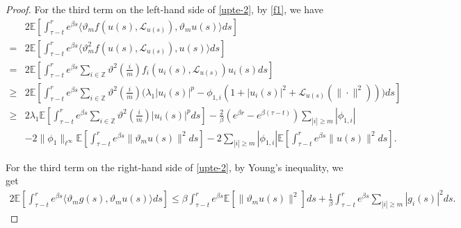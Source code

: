 \documentclass[11pt]{article}
\numberwithin{equation}{section}
\theoremstyle{plain}
\begin{document}
\begin{proof}
 For the third term on the left-hand side of \eqref{upte-2},
 by \eqref{f1}, we have
 \begin{align}\label{upte-4}
        & 2\mathbb{E}
               \left[ \int_{\tau-t}^{r} e^{\beta s}
                           \langle \vartheta_m f(u(s), \mathcal{L}_{u(s)}), \vartheta_m u(s) \rangle ds
               \right]  \nonumber\\
      = & 2\mathbb{E}
               \left[ \int_{\tau-t}^{r} e^{\beta s}
                            \langle{\vartheta}^2_m f(u(s), \mathcal{L}_{u(s)}),  u(s) \rangle ds
               \right]  \nonumber\\
      = & 2\mathbb{E}
               \left[ \int_{\tau-t}^{r} e^{\beta s}
                         \sum_{i \in \mathbb{Z}}
                              {\vartheta}^2(\frac{i}{m}) f_i(u_i(s), \mathcal{L}_{u(s)}) u_i(s) ds
               \right]  \nonumber\\
   \ge & 2\mathbb{E}
               \left[ \int_{\tau-t}^{r} e^{\beta s}
                            \sum_{i \in \mathbb{Z}}
                                 {\vartheta}^2(\frac{i}{m})
                                  \Big( \lambda_1 |u_i(s)|^p - \phi_{1,i} \left( 1 + |u_i(s)|^2 + \mathcal{L}_{u(s)}(\|\cdot\|^2) \right)
                                  \Big) ds
               \right]  \nonumber\\
   \ge & 2\lambda_1 \mathbb{E}
              \left[ \int_{\tau-t}^{r} e^{\beta s}
                        \sum_{i \in \mathbb{Z}}
                             {\vartheta}^2(\frac{i}{m}) |u_i(s)|^p ds
              \right]
          - \frac{2}{\beta} (e^{\beta r} - e^{\beta(\tau-t)}) \sum_{|i| \ge m} |\phi_{1,i}|  \nonumber\\
        & - 2 \| \phi_1 \|_{\ell^\infty}
              \mathbb{E}
                 \left[ \int_{\tau-t}^{r}  e^{\beta s} \|\vartheta_m u(s)\|^2 ds
                 \right]
          - 2 \sum_{|i| \ge m} |\phi_{1,i}|
                   \mathbb{E}
                      \left[ \int_{\tau-t}^{r} e^{\beta s} \|u(s)\|^2 ds
                      \right].
 \end{align}

 For the third term on the right-hand side of \eqref{upte-2}, by Young's inequality, we get
 \begin{align}\label{upte-5}
        2 \mathbb{E}
             \left[ \int_{\tau-t}^{r} e^{\beta s}
                        \langle \vartheta_m g(s), \vartheta_m u(s) \rangle ds
             \right]
    \le \beta \int_{\tau-t}^{r}  e^{\beta s}
                  \mathbb{E} \left[ \|\vartheta_m u(s)\|^2 \right] ds
          + \frac{1}{\beta} \int_{\tau-t}^{r} e^{\beta s} \sum_{|i| \ge m} |g_i(s)|^2 ds.
 \end{align}


\end{proof}
\end{document}
